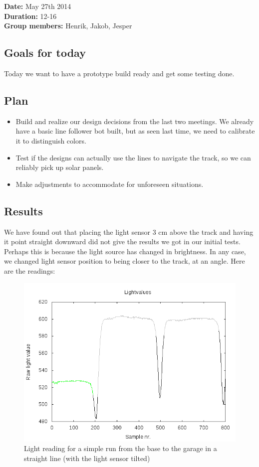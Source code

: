 \textbf{Date:} May 27th 2014\\\textbf{Duration:} 12-16\\\textbf{Group
members:} Henrik, Jakob, Jesper

\subsection{Goals for today}

Today we want to have a prototype build ready and get some testing done.

\subsection{Plan}

\begin{itemize}
\itemsep1pt\parskip0pt
\item
  Build and realize our design decisions from the last two meetings. We
  already have a basic line follower bot built, but as seen last time,
  we need to calibrate it to distinguish colors.
\item
  Test if the designs can actually use the lines to navigate the track,
  so we can reliably pick up solar panels.
\item
  Make adjustments to accommodate for unforeseen situations.
\end{itemize}

\subsection{Results}

We have found out that placing the light sensor 3 cm above the track and
having it point straight downward did not give the results we got in our
initial tests. Perhaps this is because the light source has changed in
brightness. In any case, we changed light sensor position to being
closer to the track, at an angle. Here are the
readings:
\begin{figure}[hbt]
  \centering
  \includegraphics[scale=0.5]{../experiments/1prototype/results/gnuplot/GridAccuracyTilt_color.png}
  \caption{Light reading for a simple run from the base to the garage in a straight line (with the light sensor tilted)}
\end{figure}

